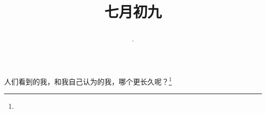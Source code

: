 \title{\date[d=12,m=8,y=2024][year:cn-y,年,month:cn,day:cn,日,·,weekday]·七月初九 }
人们看到的我，和我自己认为的我，哪个更长久呢？\footnote{ }

